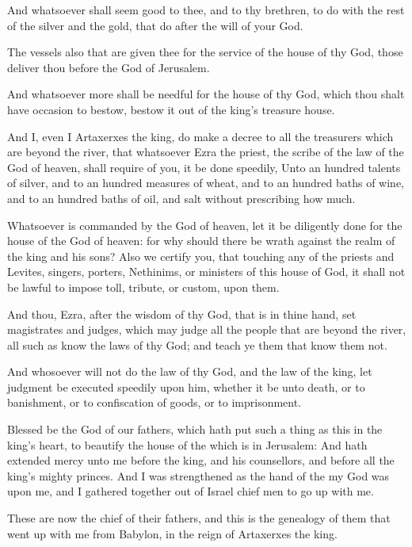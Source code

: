 \Verse And whatsoever shall seem good to thee, and to thy brethren, to do with the rest of the silver and the gold, that do after the will of your God.

\Verse The vessels also that are given thee for the service of the house of thy God, those deliver thou before the God of Jerusalem.

\Verse And whatsoever more shall be needful for the house of thy God, which thou shalt have occasion to bestow, bestow it out of the king's treasure house.

\Verse And I, even I Artaxerxes the king, do make a decree to all the treasurers which are beyond the river, that whatsoever Ezra the priest, the scribe of the law of the God of heaven, shall require of you, it be done speedily, \Verse Unto an hundred talents of silver, and to an hundred measures of wheat, and to an hundred baths of wine, and to an hundred baths of oil, and salt without prescribing how much.

\Verse Whatsoever is commanded by the God of heaven, let it be diligently done for the house of the God of heaven: for why should there be wrath against the realm of the king and his sons?  \Verse Also we certify you, that touching any of the priests and Levites, singers, porters, Nethinims, or ministers of this house of God, it shall not be lawful to impose toll, tribute, or custom, upon them.

\Verse And thou, Ezra, after the wisdom of thy God, that is in thine hand, set magistrates and judges, which may judge all the people that are beyond the river, all such as know the laws of thy God; and teach ye them that know them not.

\Verse And whosoever will not do the law of thy God, and the law of the king, let judgment be executed speedily upon him, whether it be unto death, or to banishment, or to confiscation of goods, or to imprisonment.

\Verse Blessed be the \LORD God of our fathers, which hath put such a thing as this in the king's heart, to beautify the house of the \LORD which is in Jerusalem: \Verse And hath extended mercy unto me before the king, and his counsellors, and before all the king's mighty princes.  And I was strengthened as the hand of the \LORD my God was upon me, and I gathered together out of Israel chief men to go up with me.


\Chapter
\Verse These are now the chief of their fathers, and this is the genealogy of them that went up with me from Babylon, in the reign of Artaxerxes the king.

